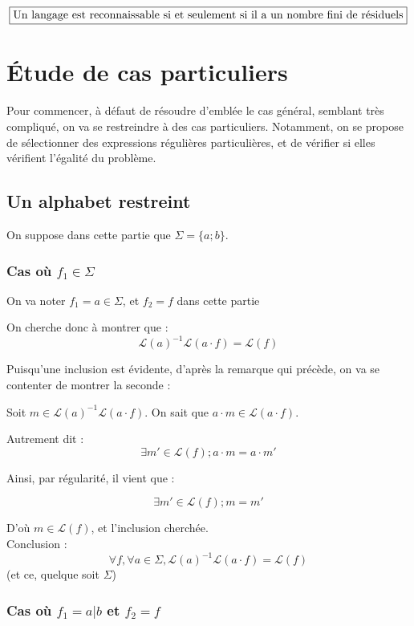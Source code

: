 \documentclass{article}
\begin{document}
$$\boxed{\textup{Un langage est reconnaissable si et seulement si il a un nombre fini de résiduels}}$$

\section{Étude de cas particuliers}

Pour commencer, à défaut de résoudre d'emblée le cas général, semblant très compliqué, on va se restreindre à des cas particuliers. Notamment, on se propose de sélectionner des expressions régulières particulières, et de vérifier si elles vérifient l'égalité du problème.

\subsection{Un alphabet restreint}

On suppose dans cette partie que $\Sigma = \{a ; b\}$.

\subsubsection{Cas où $f_1 \in \Sigma$}

On va noter $f_1 = a \in \Sigma$, et $f_2 = f$ dans cette partie

On cherche donc à montrer que :
$$\mathcal{L}(a)^{-1}\mathcal{L}(a \cdot f) = \mathcal{L}(f)$$

Puisqu'une inclusion est évidente, d'après la remarque qui précède, on va se contenter de montrer la seconde :

Soit $m \in \mathcal{L}(a)^{-1}\mathcal{L}(a \cdot f)$. On sait que $a \cdot m \in \mathcal{L}(a \cdot f)$.

Autrement dit :
$$\exists m' \in \mathcal{L}(f) ; a \cdot m = a \cdot m'$$

Ainsi, par régularité, il vient que :

$$\exists m' \in \mathcal{L}(f) ; m = m'$$

D'où $m \in \mathcal{L}(f)$, et l'inclusion cherchée.
\\

Conclusion :
$$\forall f, \forall a \in \Sigma, \boxed{\mathcal{L}(a)^{-1}\mathcal{L}(a \cdot f) = \mathcal{L}(f)}$$
(et ce, quelque soit $\Sigma$)

\subsubsection{Cas où $f_1 = a|b$ et $f_2 = f$}
\end{document}
